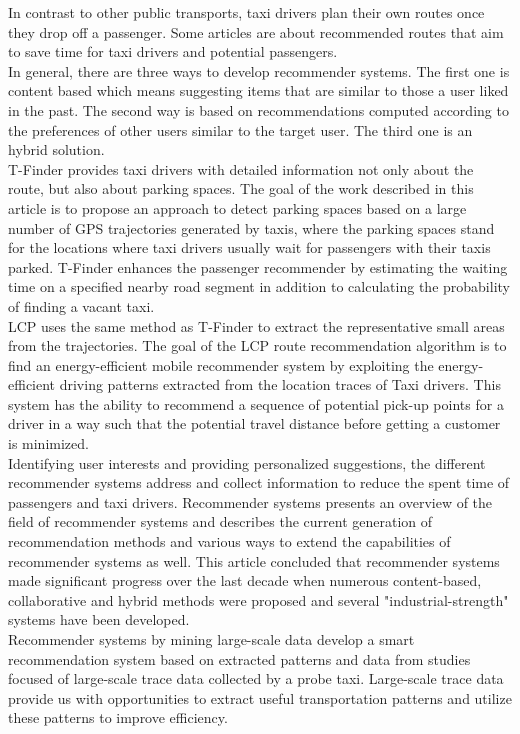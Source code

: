 \documentclass[11pt,conference,a4paper,twocolumns,romanappendices]{IEEEtran}
\begin{document}
In contrast to other public transports, taxi drivers plan their own routes once they drop off a passenger. Some articles are about recommended routes that aim to save time for taxi drivers and potential passengers. \\
In general, there are three ways to develop recommender systems. The first one is content based which means suggesting items that are similar to those a user liked in the past. The second way is based on recommendations computed according to the preferences of other users similar to the target user. The third one is an hybrid solution. \\
T-Finder provides taxi drivers with detailed information not only about the route, but also about parking spaces. \cite{tf} The goal of the work described in this article is to propose an approach to detect parking spaces based on a large number of GPS trajectories generated by taxis, where the parking spaces stand for the locations where taxi drivers usually wait for passengers with their taxis parked. T-Finder enhances the passenger recommender by estimating the waiting time on a specified nearby road segment in addition to calculating the probability of finding a vacant taxi. \\
LCP \cite{eff} uses the same method as T-Finder \cite{tf} to extract the representative small areas from the trajectories. The goal of the LCP route recommendation algorithm is to find an energy-efficient mobile recommender system by exploiting the energy-efficient driving patterns extracted from the location traces of Taxi drivers. This system has the ability to recommend a sequence of potential pick-up points for a driver in a way such that the potential travel distance before getting a customer is minimized. \\
Identifying user interests and providing personalized suggestions, the different recommender systems address and collect information to reduce the spent time of passengers and taxi drivers. Recommender systems \cite{tow} presents an overview of the field of recommender systems and describes the current generation of recommendation methods and various ways to extend the capabilities of recommender systems as well. This article concluded that recommender systems made significant progress over the last decade when numerous content-based, collaborative and hybrid methods were proposed and several "industrial-strength" systems have been developed. \\
Recommender systems by mining large-scale \cite{min1,min2} data develop a smart recommendation system based on extracted patterns and data from studies focused of large-scale trace data collected by a probe taxi. Large-scale trace data provide us with opportunities to extract useful transportation patterns and utilize these patterns to improve efficiency.
\end{document}
